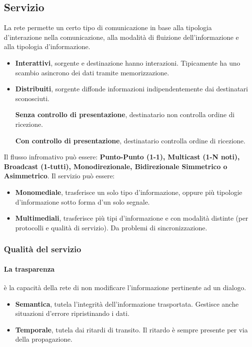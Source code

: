\subsection{Servizio}
La rete permette un certo tipo di comunicazione in base alla tipologia d'interazione nella comunicazione, alla modalità di fluizione dell'informazione e alla tipologia d'informazione.
\begin{itemize}
	\item \textbf{Interattivi}, sorgente e destinazione hanno interazioni. Tipicamente ha uno scambio asincrono dei dati tramite memorizzazione.
	\item \textbf{Distribuiti}, sorgente diffonde informazioni indipendentemente dai destinatari sconosciuti.

	\textbf{Senza controllo di presentazione}, destinatario non controlla ordine di ricezione.

	\textbf{Con controllo di presentazione}, destinatario controlla ordine di ricezione.
\end{itemize}
Il flusso infromativo può essere: \textbf{Punto-Punto (1-1), Multicast (1-N noti), Broadcast (1-tutti), Monodirezionale, Bidirezionale Simmetrico o Asimmetrico}.
Il servizio può essere:
\begin{itemize}
	\item \textbf{Monomediale}, trasferisce un solo tipo d'informazione, oppure più tipologie d'informazione sotto forma d'un solo segnale.
	\item \textbf{Multimediali}, trasferisce più tipi d'informazione e con modalità distinte (per protocolli e qualità di servizio). Da problemi di sincronizzazione.
\end{itemize}
\subsubsection{Qualità del servizio}
\paragraph{La trasparenza} è la capacità della rete di non modificare l'informazione pertinente ad un dialogo.
\begin{itemize}
	\item \textbf{Semantica}, tutela l'integrità dell'informazione trasportata. Gestisce anche situazioni d'errore ripristinando i dati.
	\item \textbf{Temporale}, tutela dai ritardi di transito. Il ritardo è sempre presente per via della propagazione.
\end{itemize}


